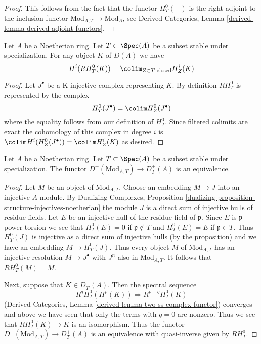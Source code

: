 \begin{proof}
This follows from the fact that the functor $H^0_T(-)$ is
the right adjoint to the inclusion functor
$\text{Mod}_{A, T} \to \text{Mod}_A$, see
Derived Categories, Lemma \ref{derived-lemma-derived-adjoint-functors}.
\end{proof}

\begin{lemma}
\label{lemma-adjoint-ext}
Let $A$ be a Noetherian ring. Let $T \subset \Spec(A)$
be a subset stable under specialization.
For any object $K$ of $D(A)$ we have
$$
H^i(RH^0_T(K)) = \colim_{Z \subset T\text{ closed}} H^i_Z(K)
$$
\end{lemma}

\begin{proof}
Let $J^\bullet$ be a K-injective complex representing $K$.
By definition $RH^0_T$ is represented by the complex
$$
H^0_T(J^\bullet) = \colim H^0_Z(J^\bullet)
$$
where the equality follows from our definition of $H^0_T$.
Since filtered colimits are exact the cohomology of this
complex in degree $i$ is
$\colim H^i(H^0_Z(J^\bullet)) = \colim H^i_Z(K)$
as desired.
\end{proof}

\begin{lemma}
\label{lemma-equal-plus}
Let $A$ be a Noetherian ring. Let $T \subset \Spec(A)$ be a subset stable
under specialization. The functor $D^+(\text{Mod}_{A, T}) \to D^+_T(A)$
is an equivalence.
\end{lemma}

\begin{proof}
Let $M$ be an object of $\text{Mod}_{A, T}$. Choose an embedding
$M \to J$ into an injective $A$-module. By
Dualizing Complexes, Proposition
\ref{dualizing-proposition-structure-injectives-noetherian}
the module $J$ is a direct sum of injective hulls of residue fields.
Let $E$ be an injective hull of the residue field of $\mathfrak p$.
Since $E$ is $\mathfrak p$-power torsion we see that
$H^0_T(E) = 0$ if $\mathfrak p \not \in T$ and
$H^0_T(E) = E$ if $\mathfrak p \in T$.
Thus $H^0_T(J)$ is injective as a direct sum of injective hulls
(by the proposition) and we have an embedding $M \to H^0_T(J)$.
Thus every object $M$ of $\text{Mod}_{A, T}$ has an injective resolution
$M \to J^\bullet$ with $J^n$ also in $\text{Mod}_{A, T}$. It follows
that $RH^0_T(M) = M$.

\medskip\noindent
Next, suppose that $K \in D_T^+(A)$. Then the spectral sequence
$$
R^qH^0_T(H^p(K)) \Rightarrow R^{p + q}H^0_T(K)
$$
(Derived Categories, Lemma \ref{derived-lemma-two-ss-complex-functor})
converges and above we have seen that only the terms with $q = 0$
are nonzero. Thus we see that $RH^0_T(K) \to K$ is an isomorphism.
Thus the functor $D^+(\text{Mod}_{A, T}) \to D^+_T(A)$
is an equivalence with quasi-inverse given by $RH^0_T$.
\end{proof}


